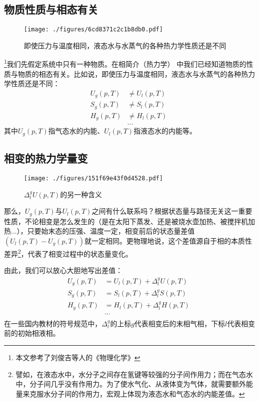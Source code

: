 

\subsection{物质性质与相态有关}
\begin{figure}[ht]
\centering
\texttt{[image: ./figures/6cd8371c2c1b8db0.pdf]}
\caption{即使压力与温度相同，液态水与水蒸气的各种热力学性质还是不同} \label{fig_PTTVC2_1}
\end{figure}

\footnote{本文参考了刘俊吉等人的《物理化学》}我们先假定系统中只有一种物质。在相简介（热力学） 中我们已经知道物质的性质与物质的相态有关。比如说，即使压力与温度相同，液态水与水蒸气的各种热力学性质还是不同：
$$
\begin{aligned}
U_g(p,T) &\ne U_l(p,T)\\
S_g(p,T) &\ne S_l(p,T)\\
H_g(p,T) &\ne H_l(p,T)\\
&...
\end{aligned}~
$$
其中$U_g(p,T)$指气态水的内能、$U_l(p,T)$指液态水的内能等。

\subsection{相变的热力学量变}

\begin{figure}[ht]
\centering
\texttt{[image: ./figures/151f69e43f0d4528.pdf]}
\caption{$\Delta ^ g_l U (p,T)$的另一种含义} \label{fig_PTTVC2_2}
\end{figure}

那么，$U_g(p,T)$与$U_l(p,T)$之间有什么联系吗？根据状态量与路径无关这一重要性质，不论相变是怎么发生的（是在太阳下蒸发、还是被烧水壶加热、被搅拌机加热...），只要始末态的压强、温度一定，相变前后的状态量差值$(U_l(p,T) - U_g(p,T))$就一定相同。更物理地说，这个差值源自于相的本质性差异\footnote{譬如，在液态水中，水分子之间存在氢键等较强的分子间作用力；而在气态水中，分子间几乎没有作用力。为了使水气化、从液体变为气体，就需要额外能量来克服水分子间的作用力，宏观上体现为液态水和气态水的内能差值。}，代表了相变过程中的状态量变化。

由此，我们可以放心大胆地写出差值：
$$
\begin{aligned}
U_g(p,T) &= U_l(p,T) + \Delta ^ g_l U (p,T)\\
S_g(p,T) &= S_l(p,T) + \Delta ^ g_l S (p,T)\\
H_g(p,T) &= H_l(p,T) + \Delta ^ g_l H (p,T)\\
&...\\
\end{aligned}~
$$
在一些国内教材的符号规范中，$\Delta^g_l$的上标$g$代表相变后的末相气相，下标$l$代表相变前的初始相液相。

